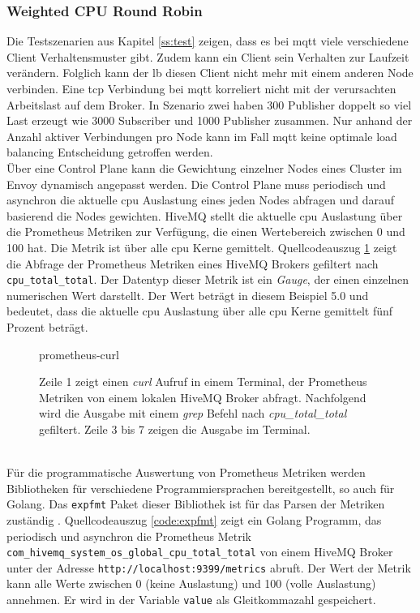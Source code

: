 \subsubsection{Weighted CPU Round Robin} \label{ss:weighted-cpu}
Die Testszenarien aus Kapitel \ref{ss:test} zeigen, dass es bei \ac{mqtt} viele verschiedene Client Verhaltensmuster gibt. Zudem kann ein Client sein Verhalten zur Laufzeit verändern.
Folglich kann der \acl{lb} diesen Client nicht mehr mit einem anderen Node verbinden.
Eine \ac{tcp} Verbindung bei \ac{mqtt} korreliert nicht mit der verursachten Arbeitslast auf dem Broker. In Szenario zwei haben 300 Publisher doppelt so viel Last erzeugt wie 3000 Subscriber und 1000 Publisher zusammen.
Nur anhand der Anzahl aktiver Verbindungen pro Node kann im Fall \ac{mqtt} keine optimale load balancing Entscheidung getroffen werden.
\\
Über eine Control Plane kann die Gewichtung einzelner Nodes eines Cluster im Envoy dynamisch angepasst werden.
Die Control Plane muss periodisch und asynchron die aktuelle \ac{cpu} Auslastung eines jeden Nodes abfragen und darauf basierend die Nodes gewichten.
HiveMQ stellt die aktuelle \ac{cpu} Auslastung über die Prometheus Metriken zur Verfügung, die einen Wertebereich zwischen 0 und 100 hat. Die Metrik ist über alle \ac{cpu} Kerne gemittelt.
Quellcodeauszug \ref{code:prometheus-curl} zeigt die Abfrage der Prometheus Metriken eines HiveMQ Brokers gefiltert nach \verb|cpu_total_total|. Der Datentyp dieser Metrik ist ein \textit{Gauge}, der einen einzelnen numerischen Wert darstellt.\cite{prometheusMetricTypesPrometheus} Der Wert beträgt in diesem Beispiel 5.0 und bedeutet, dass die aktuelle \ac{cpu} Auslastung über alle \ac{cpu} Kerne gemittelt fünf Prozent beträgt.
\begin{figure}
    {prometheus-curl}
    \caption{Zeile 1 zeigt einen \textit{curl} Aufruf in einem Terminal, der Prometheus Metriken von einem lokalen HiveMQ Broker abfragt. Nachfolgend wird die Ausgabe mit einem \textit{grep} Befehl nach \textit{cpu\_total\_total} gefiltert. Zeile 3 bis 7 zeigen die Ausgabe im Terminal.}
    \label{code:prometheus-curl}
\end{figure}
\\
Für die programmatische Auswertung von Prometheus Metriken werden Bibliotheken für verschiedene Programmiersprachen bereitgestellt, so auch für Golang.
Das \verb|expfmt| Paket dieser Bibliothek ist für das Parsen der Metriken zuständig \cite{ExpfmtPkgGo}.
Quellcodeauszug \ref{code:expfmt} zeigt ein Golang Programm, das periodisch und asynchron die Prometheus Metrik \verb|com_hivemq_system_os_global_cpu_total_total| von einem HiveMQ Broker unter der Adresse \verb|http://localhost:9399/metrics| abruft. Der Wert der Metrik kann alle Werte zwischen 0 (keine Auslastung) und 100 (volle Auslastung) annehmen. Er wird in der Variable \verb|value| als Gleitkommazahl gespeichert.
